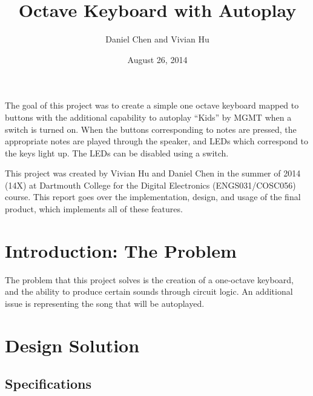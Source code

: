 \documentclass{article}
\title{Octave Keyboard with Autoplay}
\author{Daniel Chen and Vivian Hu}
\date{August 26, 2014}
\begin{document}
\maketitle

\vspace{-1.5em}

The goal of this project was to create a simple one­ octave keyboard mapped to buttons with the additional capability to autoplay ``Kids'' by MGMT when a switch is turned on. When the buttons corresponding to notes are pressed, the appropriate notes are played through the speaker, and LEDs which correspond to the keys light up. The LEDs can be disabled using a switch. 

This project was created by Vivian Hu and Daniel Chen in the summer of 2014 (14X) at Dartmouth College for the Digital Electronics (ENGS031/COSC056) course. This report goes over the implementation, design, and usage of the final product, which implements all of these features.

\vspace{-2.5em}
\newpage
\singlespacing
\tableofcontents

\newpage
\section{Introduction: The Problem} %

  The problem that this project solves is the creation of a one-octave keyboard, and the ability to produce certain sounds through circuit logic. An additional issue is representing the song that will be autoplayed.

\vspace{-1em}
\section{Design Solution}

  \subsection{Specifications}
  
\end{document}
